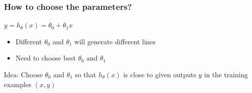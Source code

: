 \documentclass[xcolor=pdftex,dvipsnames]{beamer}
\begin{document}
\begin{frame}
  \frametitle{How to choose the parameters?}
  \begin{block}{}
    \begin{center}
      $y = h_{\theta}(x) = \theta_0 + \theta_1 x$
    \end{center}
  \end{block}
  \pause
  \begin{itemize}
  \item Different $\theta_0$ and $\theta_1$ will generate different lines
    \begin{center}
    \end{center}
  \pause \item Need to choose \alert{best} $\theta_0$ and $\theta_1$ 
  \end{itemize}
  \pause
  \begin{block}{}
    Idea: Choose $\theta_0$ and $\theta_1$ so that $h_{\theta}(x)$ is close to given outputs $y$ in the training examples $(x,y)$  
  \end{block}
\end{frame}
\end{document}
